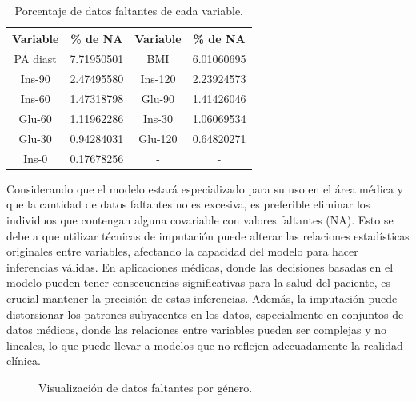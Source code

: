 \begin{table}[H]
\centering
\begin{tabular}{||c|c||c|c||}
\hline\hline
\textbf{Variable} & \textbf{\% de NA} & \textbf{Variable} & \textbf{\% de NA} \\ \hline\hline
PA diast          & 7.71950501        & BMI               & 6.01060695        \\ \hline
Ins-90            & 2.47495580        & Ins-120           & 2.23924573        \\ \hline
Ins-60            & 1.47318798        & Glu-90            & 1.41426046        \\ \hline
Glu-60            & 1.11962286        & Ins-30            & 1.06069534        \\ \hline
Glu-30            & 0.94284031        & Glu-120           & 0.64820271        \\ \hline
Ins-0             & 0.17678256        & -                 & -       \\ \hline\hline
\end{tabular}
\caption{Porcentaje de datos faltantes de cada variable.}
\label{tab:PorcentajeNA}
\end{table}

Considerando que el modelo estará especializado para su uso en el área médica y que la cantidad de datos faltantes no es excesiva, es preferible eliminar los individuos que contengan alguna covariable con valores faltantes (NA). Esto se debe a que utilizar técnicas de imputación puede alterar las relaciones estadísticas originales entre variables, afectando la capacidad del modelo para hacer inferencias válidas. En aplicaciones médicas, donde las decisiones basadas en el modelo pueden tener consecuencias significativas para la salud del paciente, es crucial mantener la precisión de estas inferencias. Además, la imputación puede distorsionar los patrones subyacentes en los datos, especialmente en conjuntos de datos médicos, donde las relaciones entre variables pueden ser complejas y no lineales, lo que puede llevar a modelos que no reflejen adecuadamente la realidad clínica.

\begin{figure}[H]
 \centering
    \caption{Visualización de datos faltantes por género.}
    \label{fig:FaltantesGen}
\end{figure}

